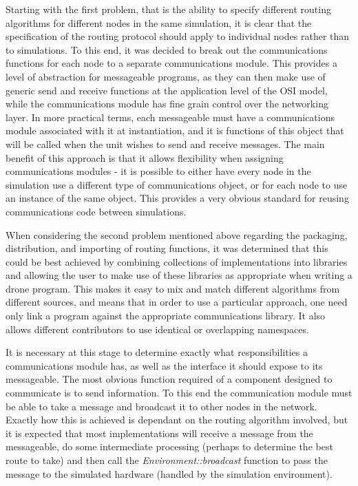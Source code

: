 Starting with the first problem, that is the ability to specify different routing algorithms for different nodes in the same simulation, it is clear that the specification of the routing protocol should apply to individual nodes rather than to simulations. To this end, it was decided to break out the communications functions for each node to a separate communications module. This provides a level of abstraction for messageable programs, as they can then make use of generic send and receive functions at the application level of the OSI model, while the communications module has fine grain control over the networking layer. In more practical terms, each messageable must have a communications module associated with it at instantiation, and it is functions of this object that will be called when the unit wishes to send and receive messages. The main benefit of this approach is that it allows flexibility when assigning communications modules - it is possible to either have every node in the simulation use a different type of communications object, or for each node to use an instance of the same object. This provides a very obvious standard for reusing communications code between simulations.

When considering the second problem mentioned above regarding the packaging, distribution, and importing of routing functions, it was determined that this could be best achieved by combining collections of implementations into libraries and allowing the user to make use of these libraries as appropriate when writing a drone program. This makes it easy to mix and match different algorithms from different sources, and means that in order to use a particular approach, one need only link a program against the appropriate communications library. It also allows different contributors to use identical or overlapping namespaces.

It is necessary at this stage to determine exactly what responsibilities a communications module has, as well as the interface it should expose to its messageable. The most obvious function required of a component designed to communicate is to send information. To this end the communication module must be able to take a message and broadcast it to other nodes in the network. Exactly how this is achieved is dependant on the routing algorithm involved, but it is expected that most implementations will receive a message from the messageable, do some intermediate processing (perhaps to determine the best route to take) and then call the \textit{Environment::broadcast} function to pass the message to the simulated hardware (handled by the simulation environment).

